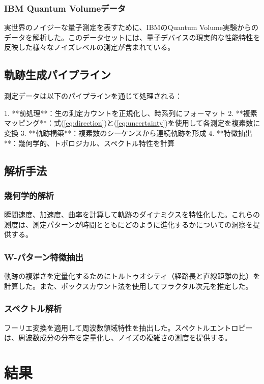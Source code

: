 \documentclass[a4paper,11pt]{article}
\begin{document}
\begin{CJK}{UTF8}{min}
\subsubsection{IBM Quantum Volumeデータ}
実世界のノイジーな量子測定を表すために、IBMのQuantum Volume実験からのデータを解析した。このデータセットには、量子デバイスの現実的な性能特性を反映した様々なノイズレベルの測定が含まれている。

\subsection{軌跡生成パイプライン}

測定データは以下のパイプラインを通じて処理される：

1. **前処理**：生の測定カウントを正規化し、時系列にフォーマット
2. **複素マッピング**：式(\ref{eq:direction})と(\ref{eq:uncertainty})を使用して各測定を複素数に変換
3. **軌跡構築**：複素数のシーケンスから連続軌跡を形成
4. **特徴抽出**：幾何学的、トポロジカル、スペクトル特性を計算

\subsection{解析手法}

\subsubsection{幾何学的解析}
瞬間速度、加速度、曲率を計算して軌跡のダイナミクスを特性化した。これらの測度は、測定パターンが時間とともにどのように進化するかについての洞察を提供する。

\subsubsection{W-パターン特徴抽出}
軌跡の複雑さを定量化するためにトルトゥオシティ（経路長と直線距離の比）を計算した。また、ボックスカウント法を使用してフラクタル次元を推定した。

\subsubsection{スペクトル解析}
フーリエ変換を適用して周波数領域特性を抽出した。スペクトルエントロピーは、周波数成分の分布を定量化し、ノイズの複雑さの測度を提供する。

\section{結果}


\end{CJK}
\end{document}
